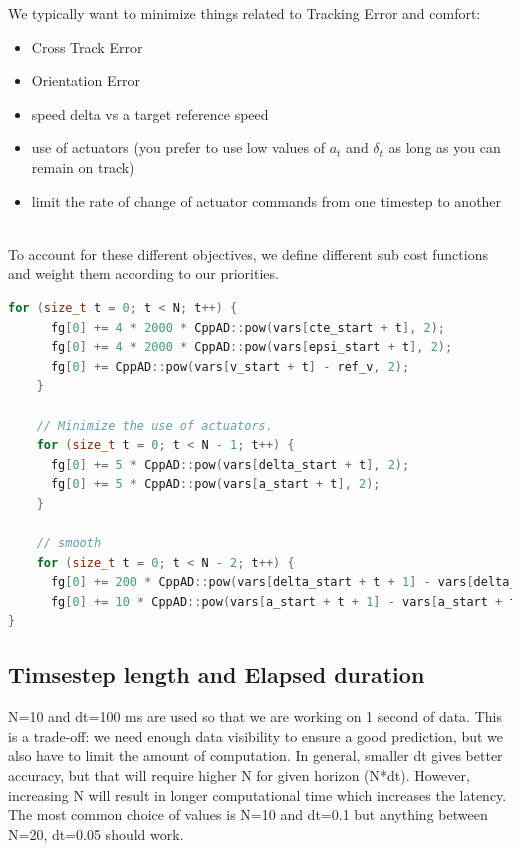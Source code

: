 \documentclass[11pt]{article}
\begin{document}
We typically want to minimize things related to Tracking Error and comfort:
\begin{itemize}
\item Cross Track Error
\item Orientation Error
\item speed delta vs a target reference speed
\item use of actuators (you prefer to use low values of $a_t$ and $\delta_t$ as long as you can remain on track)
\item limit the rate of change of actuator commands from one timestep to another
\
\end{itemize}

To account for these different objectives, we define different sub cost functions and weight them according to our priorities.

\begin{lstlisting}[language=C++, caption={Cost function example}]
    for (size_t t = 0; t < N; t++) {
      fg[0] += 4 * 2000 * CppAD::pow(vars[cte_start + t], 2);
      fg[0] += 4 * 2000 * CppAD::pow(vars[epsi_start + t], 2);
      fg[0] += CppAD::pow(vars[v_start + t] - ref_v, 2);
    }

    // Minimize the use of actuators.
    for (size_t t = 0; t < N - 1; t++) {
      fg[0] += 5 * CppAD::pow(vars[delta_start + t], 2);
      fg[0] += 5 * CppAD::pow(vars[a_start + t], 2);
    }

    // smooth
    for (size_t t = 0; t < N - 2; t++) {
      fg[0] += 200 * CppAD::pow(vars[delta_start + t + 1] - vars[delta_start + t], 2);
      fg[0] += 10 * CppAD::pow(vars[a_start + t + 1] - vars[a_start + t], 2);
}
\end{lstlisting}


\subsection{Timsestep length and Elapsed duration}

N=10 and dt=100 ms are used so that we are working on 1 second of data.
This is a trade-off: we need enough data visibility to ensure a good prediction, but we also have to limit the amount of computation.
In general, smaller dt gives better accuracy, but that will require higher N for given horizon (N*dt). However, increasing N will result in longer computational time which increases the latency. The most common choice of values is N=10 and dt=0.1 but anything between N=20, dt=0.05 should work.
\end{document}
